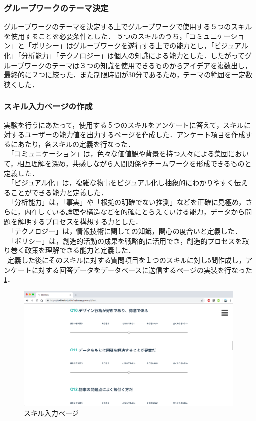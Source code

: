\documentclass{funthesis}
\begin{document}
\subsubsection{グループワークのテーマ決定}
グループワークのテーマを決定する上でグループワークで使用する５つのスキルを使用することを必要条件とした．
５つのスキルのうち，「コミュニケーション」と「ポリシー」はグループワークを遂行する上での能力とし，「ビジュアル化」「分析能力」「テクノロジー」は個人の知識による能力とした．したがってグループワークのテーマは３つの知識を使用できるものからアイデアを複数出し，最終的に２つに絞った．また制限時間が30分であるため，テーマの範囲を一定数狭くした．

\subsubsection{スキル入力ページの作成}
実験を行うにあたって，使用する５つのスキルをアンケートに答えて，スキルに対するユーザーの能力値を出力するページを作成した．アンケート項目を作成するにあたり，各スキルの定義を行なった．\\
\ 「コミュニケーション」は，色々な価値観や背景を持つ人々による集団において，相互理解を深め，共感しながら人間関係やチームワークを形成できるものと定義した．\\
\ 「ビジュアル化」は，複雑な物事をビジュアル化し抽象的にわかりやすく伝えることができる能力と定義した．\\
\ 「分析能力」は，「事実」や「根拠の明確でない推測」などを正確に見極め，さらに，内在している論理や構造などを的確にとらえていける能力，データから問題を解明するプロセスを構想する力とした．\\
\ 「テクノロジー」は，情報技術に関しての知識，関心の度合いと定義した．\\
\ 「ポリシー」は，創造的活動の成果を戦略的に活用でき，創造的プロセスを取り巻く政策を理解できる能力と定義した．\\
\ 定義した後にそのスキルに対する質問項目を１つのスキルに対し5問作成し，アンケートに対する回答データをデータベースに送信するページの実装を行なった\ref{testtest}．

\begin{figure}[h]
 \centering
   \includegraphics[width=150mm]{figures/test.png}
 \caption{スキル入力ページ}
 \label{testtest}
\end{figure}
\end{document}
